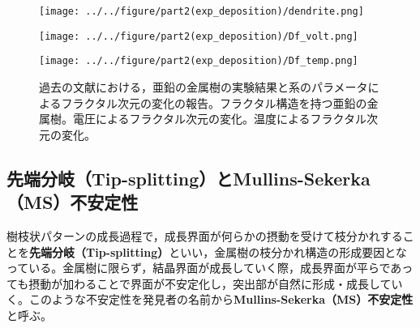 \documentclass[autodetect-engine,dvi=dvipdfmx,a4paper,ja=standard,oneside,openany]{bxjsbook}
\begin{document}
\begin{figure}[htbp]
  \begin{minipage}{0.28\textwidth}
    \subcaption{}
    \centering
    \texttt{[image: ../../figure/part2(exp\_deposition)/dendrite.png]}
    \label{fig:el_dep_fractal}
  \end{minipage}
  \begin{minipage}
    {0.35\textwidth}
    \subcaption{}
    \centering
    \texttt{[image: ../../figure/part2(exp\_deposition)/Df\_volt.png]}
    \label{fig:Df_volt}
  \end{minipage}
  \begin{minipage}
    {0.35\textwidth}
    \subcaption{}
    \centering
    \texttt{[image: ../../figure/part2(exp\_deposition)/Df\_temp.png]}
    \label{fig:Df_temp}
  \end{minipage}
  \caption{過去の文献における，亜鉛の金属樹の実験結果と系のパラメータによるフラクタル次元の変化の報告。フラクタル構造を持つ亜鉛の金属樹\cite{matsushita1984fractal}。電圧によるフラクタル次元の変化\cite{matsushita1984fractal}。温度によるフラクタル次元の変化\cite{suda2003temperature}。}
  \label{fig:fractal_dimension}
\end{figure}

\subsection{先端分岐（Tip-splitting）とMullins-Sekerka（MS）不安定性}
\label{sec:tip_splitting}
樹枝状パターンの成長過程で，成長界面が何らかの摂動を受けて枝分かれすることを\textbf{先端分岐（Tip-splitting）}といい，金属樹の枝分かれ構造の形成要因となっている。金属樹に限らず，結晶界面が成長していく際，成長界面が平らであっても摂動が加わることで界面が不安定化し，突出部が自然に形成・成長していく。このような不安定性を発見者の名前から\textbf{Mullins-Sekerka（MS）不安定性}と呼ぶ。
\end{document}
